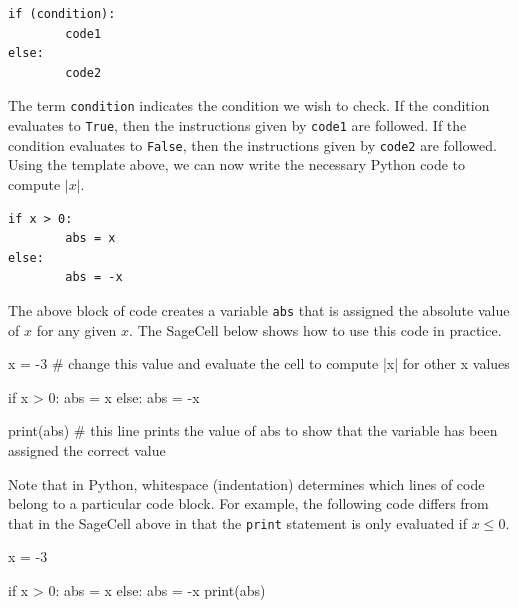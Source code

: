 \documentclass{ximera}
\begin{document}
\begin{verbatim}
if (condition):
        code1
else:
        code2
\end{verbatim}

The term \verb|condition| indicates the condition we wish to check. If the condition evaluates to \verb|True|, then the instructions given by \verb|code1| are followed. If the condition evaluates to \verb|False|, then the instructions given by \verb|code2| are followed. Using the template above, we can now write the necessary Python code to compute $|x|$.

\begin{verbatim}
if x > 0:
        abs = x
else:
        abs = -x
\end{verbatim}

The above block of code creates a variable \verb|abs| that is assigned the absolute value of $x$ for any given $x$. The SageCell below shows how to use this code in practice.

\begin{sagecell}
x = -3            # change this value and evaluate the cell to compute |x| for other x values

if x > 0:
	abs = x
else:
	abs = -x

print(abs)        # this line prints the value of abs to show that the variable has been assigned the correct value
\end{sagecell}

Note that in Python, whitespace (indentation) determines which lines of code belong to a particular code block. For example, the following code differs from that in the SageCell above in that the \verb|print| statement is only evaluated if $x\leq 0$.

\begin{sagecell}
x = -3

if x > 0:
	abs = x
else:
	abs = -x
        print(abs)
\end{sagecell}






\begin{problem}
\end{problem}

\begin{problem}
\end{problem}
\end{document}
